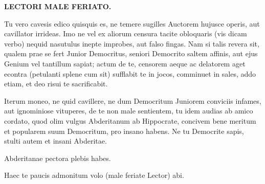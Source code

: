 {\textbf{LECTORI MALE FERIATO.}

Tu vero cavesis edico quisquis es, ne temere sugilles Auctorem hujusce
operis, aut cavillator irrideas. Imo ne vel ex aliorum censura tacite
obloquaris (vis dicam verbo) nequid nasutulus inepte improbes, aut
falso fingas. Nam si talis revera sit, qualem prae se fert Junior
Democritus, seniori Democrito saltem affinis, aut ejus Genium vel
tantillum sapiat; actum de te, censorem aeque ac delatorem aget
econtra (petulanti splene cum sit) sufflabit te in jocos, comminuet in
sales, addo etiam, et deo risui te sacrificabit.

Iterum moneo, ne quid cavillere, ne dum Democritum Juniorem conviciis
infames, aut ignominiose vituperes, de te non male sentientem, tu idem
audias ab amico cordato, quod olim vulgus Abderitanum ab 
Hippocrate, concivem bene meritum et popularem suum Democritum, pro
insano habens. Ne tu Democrite sapis, stulti autem et insani Abderitae.

Abderitanae pectora plebis habes.

Haec te paucis admonitum volo (male feriate Lector) abi.
}
